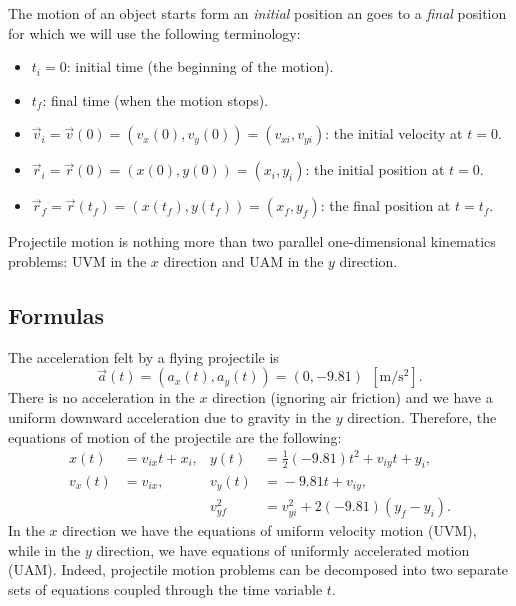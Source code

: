 \documentclass[letterpaper,9pt,journal]{IEEEtran}
\begin{document}
The motion of an object starts form an \emph{initial} position an goes to a 
\emph{final} position for which we will use the following terminology:

\begin{itemize}
\item  $t_i=0$: initial time (the beginning of the motion).
\item  $t_f$: final time (when the motion stops).
\item  $\vec{v}_{i}=\vec{v}(0)=(v_x(0),v_y(0))=(v_{xi},v_{yi})$: the initial velocity at $t=0$.
\item  $\vec{r}_i=\vec{r}(0)=(x(0),y(0))=(x_i,y_i)$: the initial position at $t=0$.
\item  $\vec{r}_f=\vec{r}(t_f)=(x(t_f),y(t_f))=(x_f,y_f)$: the final position at $t=t_f$.
\end{itemize}


Projectile motion is nothing more than two parallel one-dimensional 
kinematics problems:  UVM in the $x$ direction and UAM in the $y$ direction.

\vspace{-3mm}
\subsection{Formulas}
\label{51d24e1edefe34e683025dbba5c6eed6}%

The acceleration felt by a flying projectile is
\[ 
 \vec{a}(t) = %
  (a_x(t),a_y(t)) = (0,-9.81) \ \ [\text{m}/\text{s}^2].
\]
There is no acceleration in the $x$ direction (ignoring air friction) and we have
a uniform downward acceleration due to gravity in the $y$ direction.
Therefore, the equations of motion of the projectile are the following:
\begin{align*}
 x(t)     &\! =\!  v_{ix}t + x_i,  	 & 	y(t) &\!=\! \frac{1}{2}(-9.81)t^2 + v_{iy}t + y_i, \\
 v_x(t) & \!=\!  v_{ix},		  & 	v_y(t)  &\!=\! -9.81 t + v_{iy},  \\
 & 							&	v_{yf}^2 & \!=\!  v_{yi}^2 + 2(-9.81)(y_f - y_i).
\end{align*}
In the $x$ direction we have the equations of uniform velocity motion (UVM),
while in the $y$ direction, we have equations of uniformly accelerated motion (UAM).
Indeed, projectile motion problems can be decomposed into two separate sets of equations
coupled through the time variable $t$.
\end{document}
